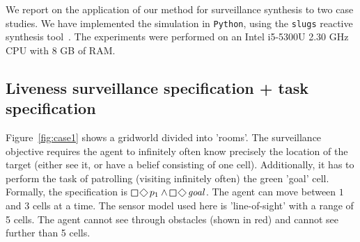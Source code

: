 We report on the application of our method for surveillance synthesis to two case studies. We have implemented the simulation in \texttt{Python}, using the \texttt{slugs} reactive synthesis tool~\cite{EhlersR16}. The experiments were performed on an Intel i5-5300U 2.30 GHz CPU with 8 GB of RAM. 

\subsection{Liveness surveillance specification + task specification}
Figure~\ref{fig:case1} shows a gridworld divided into  'rooms'. The surveillance objective requires the agent to infinitely often know precisely the location of the target (either see it, or have a belief consisting of one cell). Additionally, it has to perform the task of patrolling (visiting infinitely often) the green 'goal' cell. Formally, the specification is $\LTLglobally\LTLfinally p_1 \wedge \LTLglobally\LTLfinally \mathit{goal}$. The agent can move between $1$ and $3$ cells at a time. The sensor model used here is 'line-of-sight' with a range of 5 cells. The agent cannot see through obstacles (shown in red) and cannot see further than 5 cells. 


